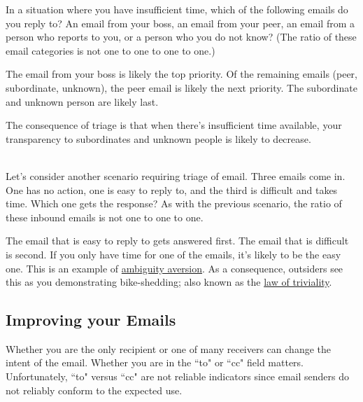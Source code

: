 In a situation where you have insufficient time, which of the following emails do you reply to? An email from your boss, an email from your peer, an email from a person who reports to you, or a person who you do not know?
(The ratio of these email categories is not one to one to one to one.)

The email from your boss is likely the top priority. Of the remaining emails (peer, subordinate, unknown), the peer email is likely the next priority.
The subordinate and unknown person are likely last.

The consequence of triage is that when there's insufficient time available, your transparency to subordinates and unknown people is likely to decrease. 

\ \\
Let's consider another scenario requiring triage of email. Three emails come in. One has no action, one is easy to reply to, and the third is difficult and takes time. Which one gets the response?
As with the previous scenario, the ratio of these inbound emails is not one to one to one.

The email that is easy to reply to gets answered first.  The email that is difficult is second.
If you only have time for one of the emails, it's likely to be the easy one. This is an example of 
\href{https://en.wikipedia.org/wiki/Ambiguity_aversion}{ambiguity aversion}.
As a consequence, outsiders see this as you demonstrating bike-shedding; also known as the
\href{https://en.wikipedia.org/wiki/Law_of_triviality}{law of triviality}.



\subsection*{Improving your Emails\label{sec:email-structure}}


Whether you are the only recipient or one of many receivers can change the intent of the email. Whether you are in the ``to" or ``cc" field matters. Unfortunately, ``to" versus ``cc" are not reliable indicators since email senders do not reliably conform to the expected use. 



